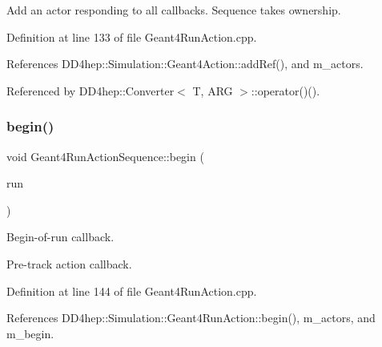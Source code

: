 Add an actor responding to all callbacks. Sequence takes ownership. 



Definition at line 133 of file Geant4\+Run\+Action.\+cpp.



References D\+D4hep\+::\+Simulation\+::\+Geant4\+Action\+::add\+Ref(), and m\+\_\+actors.



Referenced by D\+D4hep\+::\+Converter$<$ T, A\+R\+G $>$\+::operator()().

\hypertarget{class_d_d4hep_1_1_simulation_1_1_geant4_run_action_sequence_a447a8f86614e2a958dcc0761ce89344b}{}\label{class_d_d4hep_1_1_simulation_1_1_geant4_run_action_sequence_a447a8f86614e2a958dcc0761ce89344b} 
\subsubsection{\texorpdfstring{begin()}{begin()}}
{\footnotesize\ttfamily void Geant4\+Run\+Action\+Sequence\+::begin (\begin{DoxyParamCaption}\item[{const G4\+Run $\ast$}]{run }\end{DoxyParamCaption})\hspace{0.3cm}{\ttfamily [virtual]}}



Begin-\/of-\/run callback. 

Pre-\/track action callback. 

Definition at line 144 of file Geant4\+Run\+Action.\+cpp.



References D\+D4hep\+::\+Simulation\+::\+Geant4\+Run\+Action\+::begin(), m\+\_\+actors, and m\+\_\+begin.

\hypertarget{class_d_d4hep_1_1_simulation_1_1_geant4_run_action_sequence_ab5204f4d44dc2a25a21ad29fcfc30a24}{}\label{class_d_d4hep_1_1_simulation_1_1_geant4_run_action_sequence_ab5204f4d44dc2a25a21ad29fcfc30a24} 
